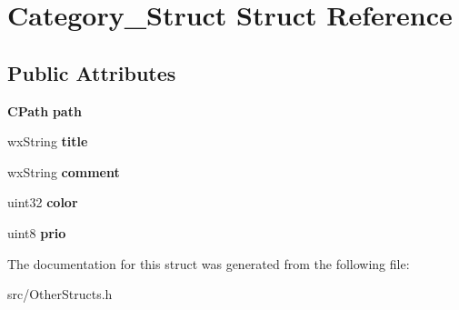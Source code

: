 \section{Category\_\-Struct Struct Reference}
\label{structCategory__Struct}
\subsection*{Public Attributes}
\begin{DoxyCompactItemize}
\item 
{\bf CPath} {\bfseries path}\label{structCategory__Struct_a64d4cd473cf0c633ae9ca22b0cae6033}

\item 
wxString {\bfseries title}\label{structCategory__Struct_a33d96f3c39cd475b6f67345eb0abe947}

\item 
wxString {\bfseries comment}\label{structCategory__Struct_a3f65dec2a49250f87ed559ba8f4f40d2}

\item 
uint32 {\bfseries color}\label{structCategory__Struct_a61f99c1d3ae76d1b9f5c24063ca6a254}

\item 
uint8 {\bfseries prio}\label{structCategory__Struct_af9bcd1ae1ee9e81722eaf54fdd55cd18}

\end{DoxyCompactItemize}


The documentation for this struct was generated from the following file:\begin{DoxyCompactItemize}
\item 
src/OtherStructs.h\end{DoxyCompactItemize}
